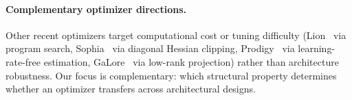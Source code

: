 \paragraph{Complementary optimizer directions.}
Other recent optimizers target computational cost or tuning difficulty (Lion~\cite{chen2024lion} via program search, Sophia~\cite{liu2024sophia} via diagonal Hessian clipping, Prodigy~\cite{mishchenko2024prodigy} via learning-rate-free estimation, GaLore~\cite{zhao2024galore} via low-rank projection) rather than architecture robustness. Our focus is complementary: which structural property determines whether an optimizer transfers across architectural designs.
